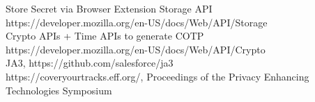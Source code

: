 \documentclass[a4paper, 11pt]{ article}
\begin{document}
\noindent
Store Secret via Browser Extension Storage API\\
https://developer.mozilla.org/en-US/docs/Web/API/Storage\\

\noindent
Crypto APIs + Time APIs to generate COTP\\
https://developer.mozilla.org/en-US/docs/Web/API/Crypto\\


\noindent
JA3, https://github.com/salesforce/ja3\\

\noindent
https://coveryourtracks.eff.org/, Proceedings of the Privacy Enhancing Technologies Symposium


\end{document}
